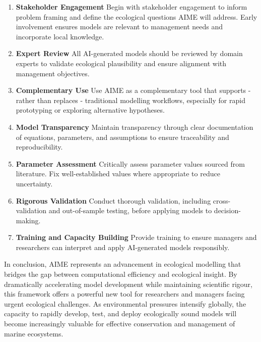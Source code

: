\begin{enumerate}
    \item \textbf{Stakeholder Engagement}  
    Begin with stakeholder engagement to inform problem framing and define the ecological questions AIME will address. Early involvement ensures models are relevant to management needs and incorporate local knowledge.

    \item \textbf{Expert Review}  
    All AI-generated models should be reviewed by domain experts to validate ecological plausibility and ensure alignment with management objectives.

    \item \textbf{Complementary Use}  
    Use AIME as a complementary tool that supports - rather than replaces - traditional modelling workflows, especially for rapid prototyping or exploring alternative hypotheses.

    \item \textbf{Model Transparency}  
    Maintain transparency through clear documentation of equations, parameters, and assumptions to ensure traceability and reproducibility.

    \item \textbf{Parameter Assessment}  
    Critically assess parameter values sourced from literature. Fix well-established values where appropriate to reduce uncertainty.

    \item \textbf{Rigorous Validation}  
    Conduct thorough validation, including cross-validation and out-of-sample testing, before applying models to decision-making.

    \item \textbf{Training and Capacity Building}  
    Provide training to ensure managers and researchers can interpret and apply AI-generated models responsibly.
\end{enumerate}

In conclusion, AIME represents an advancement in ecological modelling that bridges the gap between computational efficiency and ecological insight. By dramatically accelerating model development while maintaining scientific rigour, this framework offers a powerful new tool for researchers and managers facing urgent ecological challenges. As environmental pressures intensify globally, the capacity to rapidly develop, test, and deploy ecologically sound models will become increasingly valuable for effective conservation and management of marine ecosystems.

